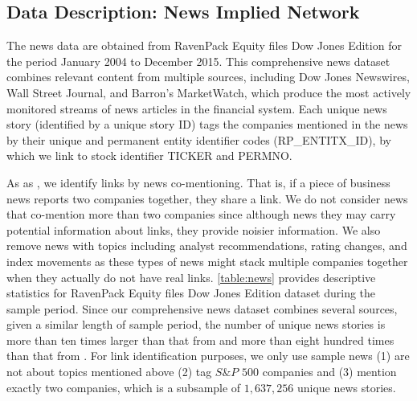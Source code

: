 \subsection{Data Description: News Implied Network}

The news data are obtained from RavenPack Equity files Dow Jones Edition for the period January 2004 to December 2015. This comprehensive news dataset combines relevant content from multiple sources, including Dow Jones Newswires, Wall Street Journal, and Barron's MarketWatch, which produce the most actively monitored streams of news articles in the financial system. Each unique news story (identified by a unique story ID) tags the companies mentioned in the news by their unique and permanent entity identifier codes (RP\_ENTITX\_ID),  by which we link to stock identifier TICKER and PERMNO.

As as \cite{ge2021news}, we identify links by news co-mentioning. That is, if a piece of business news reports two companies together, they share a link. We do not consider news that co-mention more than two companies since although news they may carry potential information about links, they provide noisier information. We also remove news with topics including analyst recommendations, rating changes, and index movements as these types of news might stack multiple companies together when they actually do not have real links. \autoref{table:news} provides descriptive statistics for RavenPack Equity files Dow Jones Edition dataset during the sample period. Since our comprehensive news dataset combines several sources, given a similar length of sample period, the number of unique news stories is more than ten times larger than that from \cite{scherbina2015economic} and more than eight hundred times than that from \cite{schwenkler2019network}. For link identification purposes, we only use sample news (1) are not about topics mentioned above (2) tag $S\& P$ $500$ companies and (3) mention exactly two companies, which is a subsample of $1,637,256$ unique news stories.

